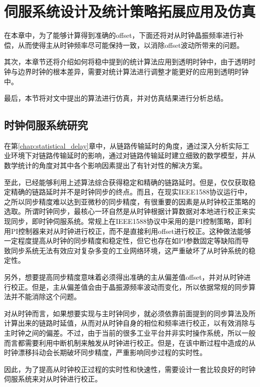 
\chapter{伺服系统设计及统计策略拓展应用及仿真}
在本章中，为了能够计算得到准确的offset，下面还将对从时钟晶振频率进行补偿，从而使得主从时钟频率尽可能保持一致，以消除offset波动所带来的问题。

其次，本章节还将介绍如何将稳中提到的统计算法应用到透明时钟中，由于透明时钟与边界时钟的根本差异，需要对统计算法进行调整才能更好的应用到透明时钟中。

最后，本节将对文中提出的算法进行仿真，并对仿真结果进行分析总结。

\section{时钟伺服系统研究}
在第\ref{chap:statistical_delay}章中，从链路传输延时的角度，通过深入分析实际工业环境下对链路传输延时的影响，通过对链路传输延时建立细致的数学模型，并从数学统计的角度对其中各个影响因素提出了有针对性的解决方案。

至此，已经能够利用上述算法综合获得稳定和精确的链路延时。但是，仅仅获取稳定精确的链路延时并不是时钟同步的终点。而且，在现实IEEE1588协议运行中，之所以同步精度难以达到亚微秒的同步精度，有很重要的因素是从时钟校正策略的选取。所谓时钟同步，最核心一环自然是从时钟根据计算数据对本地进行校正来实现同步，即时钟伺服系统。常规上在IEEE1588协议中采用的是PI控制策略，即利用PI控制器来对从时钟进行校正，而不是直接利用offset进行校正。这种做法能够一定程度提高从时钟的同步精度和稳定性，但它也存在如PI参数固定等缺陷而导致同步系统无法有效应对复杂多变的工业网络环境，这严重破坏了从时钟系统的稳定性。

另外，想要提高同步精度意味着必须得出准确的主从偏差值offset，并对从时钟进行校正。但是，主从偏差值会由于晶振源频率波动而变化，所以依据常规的同步算法并不能消除这个问题。

对从时钟而言，如果想要实现与主时钟同步，就必须依靠前面提到的同步算法及所计算出来的链路时延值，从而对从时钟自身的相位和频率进行校正，以有效消除与主时钟之间的偏差。不过，由于当前的很多工业平台并非实时操作系统，所以一般而言都需要利用中断机制来触发从时钟进行校正。但是，在该中断过程中造成的从时钟漂移抖动会长期破坏同步精度，严重影响同步过程的实时性。

因此，为了提高从时钟校正过程的实时性和快速性，需要设计一套比较良好的时钟伺服系统来对从时钟进行校正。

